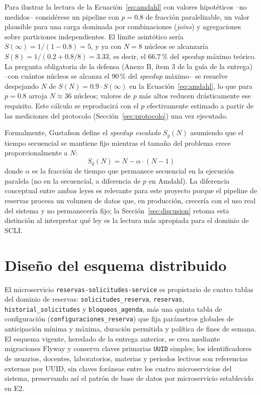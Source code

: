 \documentclass[10pt,twocolumn]{article}
\begin{document}
Para ilustrar la lectura de la Ecuación~\eqref{eq:amdahl} con valores
hipotéticos --no medidos-- considérese un pipeline con $p=0.8$ de fracción
paralelizable, un valor plausible para una carga dominada por
combinaciones (\emph{joins}) y agregaciones sobre particiones
independientes. El límite asintótico sería
$S(\infty) = 1/(1-0.8) = 5$, y ya con $N=8$ núcleos se alcanzaría
$S(8) = 1/(0.2 + 0.8/8) = 3.33$, es decir, el $66.7\,\%$ del \emph{speedup}
máximo teórico. La pregunta obligatoria de la defensa (Anexo B, ítem 3 de
la guía de la entrega) --con cuántos núcleos se alcanza el 90\,\% del
\emph{speedup} máximo-- se resuelve despejando $N$ de
$S(N) = 0.9 \cdot S(\infty)$ en la Ecuación~\eqref{eq:amdahl}, lo que para
$p=0.8$ arroja $N \approx 36$ núcleos; valores de $p$ más altos reducen
drásticamente ese requisito. Este cálculo se reproducirá con el $p$
efectivamente estimado a partir de las mediciones del protocolo
(Sección~\ref{sec:protocolo}) una vez ejecutado.

Formalmente, Gustafson define el \emph{speedup escalado} $S_g(N)$ asumiendo
que el tiempo secuencial se mantiene fijo mientras el tamaño del problema
crece proporcionalmente a $N$:
\begin{equation}
S_g(N) = N - \alpha \cdot (N-1)
\label{eq:gustafson}
\end{equation}
donde $\alpha$ es la fracción de tiempo que permanece secuencial en la
ejecución paralela (no en la secuencial, a diferencia de $p$ en Amdahl). La
diferencia conceptual entre ambas leyes es relevante para este proyecto
porque el pipeline de reservas procesa un volumen de datos que, en
producción, crecería con el uso real del sistema y no permanecería fijo;
la Sección~\ref{sec:discusion} retoma esta distinción al interpretar qué
ley es la lectura más apropiada para el dominio de SCLI.

\section{Diseño del esquema distribuido}
\label{sec:esquema}

El microservicio \texttt{reservas-solicitudes-service} es propietario de
cuatro tablas del dominio de reservas: \texttt{solicitudes\_reserva},
\texttt{reservas}, \texttt{historial\_solicitudes} y
\texttt{bloqueos\_agenda}, más una quinta tabla de configuración
(\texttt{configuraciones\_reserva}) que fija parámetros globales de
anticipación mínima y máxima, duración permitida y política de fines de
semana. El esquema vigente, heredado de la entrega anterior, se crea
mediante migraciones Flyway y conserva claves primarias \texttt{UUID}
simples; los identificadores de usuarios, docentes, laboratorios, materias
y periodos lectivos son referencias externas por UUID, sin claves foráneas
entre los cuatro microservicios del sistema, preservando así el patrón de
base de datos por microservicio establecido en E2.
\end{document}
